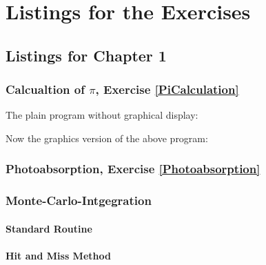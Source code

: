 %
%

\chapter{Listings for the Exercises}
\small

\section{Listings for Chapter 1}

\subsection{Calcualtion of $\pi$, Exercise \ref{PiCalculation}}
The plain program without graphical display:

Now the graphics version of the above program:


\subsection{Photoabsorption, Exercise \ref{Photoabsorption}}


\subsection{Monte-Carlo-Intgegration}
\subsubsection{Standard Routine}

\subsubsection{Hit and Miss Method}



